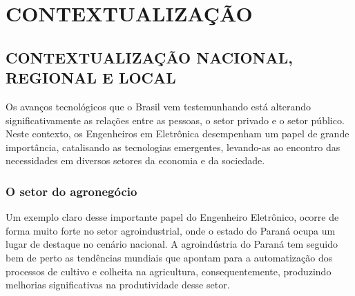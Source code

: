 \chapter{CONTEXTUALIZAÇÃO}

\section{CONTEXTUALIZAÇÃO NACIONAL, REGIONAL E LOCAL}


Os avanços tecnológicos que o Brasil vem testemunhando está alterando significativamente as relações entre as pessoas, o setor privado e o setor público. Neste contexto, os Engenheiros em Eletrônica desempenham um papel de grande importância, catalisando as tecnologias emergentes, levando-as ao encontro das necessidades em diversos setores da economia e da sociedade.


\subsection{O setor do agronegócio}

Um exemplo claro desse importante papel do Engenheiro Eletrônico, ocorre de forma muito forte no setor agroindustrial, onde o estado do Paraná ocupa um lugar de destaque no cenário nacional. A agroindústria do Paraná tem seguido bem de perto as tendências mundiais que apontam para a automatização dos processos de cultivo e colheita na agricultura, consequentemente, produzindo melhorias significativas na produtividade desse setor.

